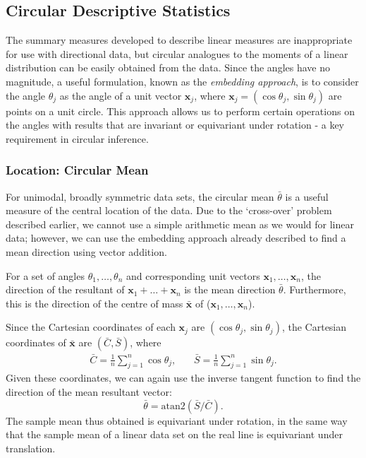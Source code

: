 \documentclass[../../ArchStats.tex]{subfiles}
\begin{document}
\subsection{Circular Descriptive Statistics}

The summary measures developed to describe linear measures are inappropriate for use with directional data, but circular analogues to the moments of a linear distribution can be easily obtained from the data. Since the angles have no magnitude, a useful formulation, known as the \textit{embedding approach}, is to consider the angle $\theta_j$ as the angle of a unit vector $\boldsymbol{x}_j$, where $\boldsymbol{x}_j = (\cos\theta_j, \sin\theta_j)$ are points on a unit circle. This approach allows us to perform certain operations on the angles with results that are invariant or equivariant under rotation - a key requirement in circular inference.


\subsubsection{Location: Circular Mean}
\label{sec:circ-mean}
For unimodal, broadly symmetric data sets, the circular mean $\bar{\theta}$ is a useful measure of the central location of the data. Due to the `cross-over' problem described earlier, we cannot use a simple arithmetic mean as we would for linear data; however, we can use the embedding approach already described to find a mean direction using vector addition. 

For a set of angles $\theta_1, \dots, \theta_n$ and corresponding unit vectors $\boldsymbol{x}_1, \dots, \boldsymbol{x}_n$, the direction of the resultant of $\boldsymbol{x}_1 + \dots + \boldsymbol{x}_n$ is the mean direction $\bar{\theta}$. Furthermore, this is the direction of the centre of mass $\boldsymbol{\bar{x}}$ of ($\boldsymbol{x}_1, \dots, \boldsymbol{x}_n$).

Since the Cartesian coordinates of each $\boldsymbol{x}_j$ are $(\cos\theta_j, \sin\theta_j)$, the Cartesian coordinates of $\boldsymbol{\bar{x}}$ are $(\bar{C}, \bar{S})$, where
	\begin{equation}
	\label{eqn:C-and-S}
	\begin{matrix*}
	\bar{C} = \frac{1}{n} \sum_{j=1}^{n} \cos \theta_j, & \, & 
	\bar{S} = \frac{1}{n} \sum_{j=1}^{n} \sin \theta_j.
	\end{matrix*}
	\end{equation}
Given these coordinates, we can again use the inverse tangent function to find the direction of the mean resultant vector: 
\begin{equation}
\label{eqn:circ-mean}
\bar{\theta} = \text{atan2}(\bar{S}/\bar{C}).
\end{equation}
 The sample mean thus obtained is equivariant under rotation, in the same way that the sample mean of a linear data set on the real line is equivariant under translation.
\end{document}
